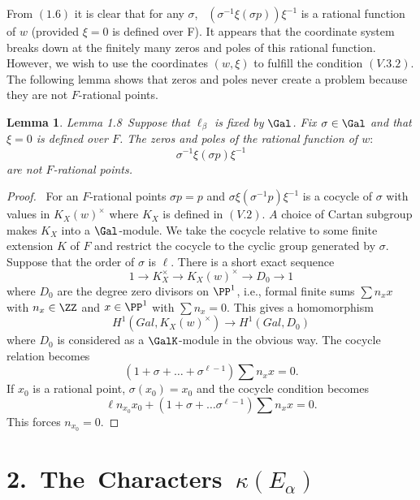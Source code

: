 \documentclass{memo-l}
\newtheorem{lemma}[theorem]{Lemma}
\theoremstyle{definition}
\theoremstyle{remark}
\numberwithin{section}{chapter}
\numberwithin{equation}{chapter}
\begin{document}
{\medskip}

    From $(1.6)$ it is clear that for any ${\sigma}$, \ 
$({\sigma}^{-1}{\xi}({\sigma}p)){\xi}^{-1}$ is a rational function of $w$
(provided ${\xi} = 0$ is defined over F).  It appears that the coordinate
system breaks down at the finitely many zeros and poles of this rational
function.  However, we wish to use the coordinates $(w,{\xi})$ to fulfill
the condition $(V.3.2)$.  The following lemma shows that zeros and poles
never create a problem because they are not $F$-rational points.

\medskip

\begin{lemma}{Lemma 1.8}\ Suppose that ${\ell}_{{\beta}}$ is fixed by
$\Gal$.  Fix ${\sigma}  \in  \Gal$ and that ${\xi} = 0$ is
defined over $F$.  The zeros and poles of the rational function of $w:$
$$
{\sigma}^{-1}{\xi}({\sigma}p){\xi}^{-1}
$$
are not $F$-rational points.
\end{lemma}

\medpagebreak

\begin{proof} \ For an $F$-rational points ${\sigma}p = p$ and
${\sigma}{\xi}({\sigma}^{-1}p){\xi}^{-1}$ is a cocycle of ${\sigma}$ with
values in $K_X(w)^{\times}$ where $K_X$ is defined in $(V.2)$.  $A$ choice of Cartan
subgroup makes $K_X$ into a $\Gal$-module.  We take the cocycle
relative to some finite extension $K$ of $F$ and restrict the cocycle to
the cyclic group generated by ${\sigma}$.  Suppose that the order of
${\sigma}$ is ${\ell}$.  There is a short exact sequence
$$
1 {\to} K_X^{\times} {\to} K_X(w)^{\times} {\to} D_{0} {\to} 1
$$
where $D_{0}$ are the degree zero divisors on ${\PP}^{1}$,  i.e.,  formal
finite sums $\sum n_{x}x$ with $n_{x} \in {\ZZ}$ and $x \in
{\PP}^{1}$ with $\sum n_{x}  =  0$.  This gives a homomorphism
$$H^{1}(Gal,K_X(w)^{\times}) \to H^{1}(Gal,D_{0})$$ where $D_{0}$ is considered as
a $\GalK$-module in the obvious way.  The cocycle relation becomes
$$
(1+{\sigma}+\ldots +{\sigma}^{{\ell}-1})\sum n_{x}x  =  0 .
$$
If $x_{0}$ is a rational point, ${\sigma}(x_{0})  =  x_{0}$ and the cocycle
condition becomes
$$
{\ell}n_{x_0} x_{0} + (1+{\sigma}+\ldots
{\sigma}^{{\ell}-1})\sum n_{x}x  =  0 .
$$
This forces $n_{x_0}  =  0$.
\end{proof} 


\section{ 2.\  The\ Characters\ ${\kappa}(E_\alpha)$}
\end{document}
